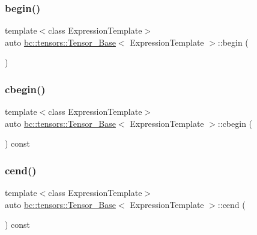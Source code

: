 \subsubsection{\texorpdfstring{begin()}{begin()}\hspace{0.1cm}{\footnotesize\ttfamily [2/2]}}
{\footnotesize\ttfamily template$<$class Expression\+Template$>$ \\
auto \hyperlink{classbc_1_1tensors_1_1Tensor__Base}{bc\+::tensors\+::\+Tensor\+\_\+\+Base}$<$ Expression\+Template $>$\+::begin (\begin{DoxyParamCaption}{ }\end{DoxyParamCaption})\hspace{0.3cm}{\ttfamily [inline]}}

\mbox{\label{classbc_1_1tensors_1_1Tensor__Base_a8cf2ebf74960d805544b77bb63d60581}} 
\subsubsection{\texorpdfstring{cbegin()}{cbegin()}}
{\footnotesize\ttfamily template$<$class Expression\+Template$>$ \\
auto \hyperlink{classbc_1_1tensors_1_1Tensor__Base}{bc\+::tensors\+::\+Tensor\+\_\+\+Base}$<$ Expression\+Template $>$\+::cbegin (\begin{DoxyParamCaption}{ }\end{DoxyParamCaption}) const\hspace{0.3cm}{\ttfamily [inline]}}

\mbox{\label{classbc_1_1tensors_1_1Tensor__Base_a36c4eaacee606e151ca6f70d9b41c26d}} 
\subsubsection{\texorpdfstring{cend()}{cend()}}
{\footnotesize\ttfamily template$<$class Expression\+Template$>$ \\
auto \hyperlink{classbc_1_1tensors_1_1Tensor__Base}{bc\+::tensors\+::\+Tensor\+\_\+\+Base}$<$ Expression\+Template $>$\+::cend (\begin{DoxyParamCaption}{ }\end{DoxyParamCaption}) const\hspace{0.3cm}{\ttfamily [inline]}}

